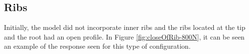   \subsection{Ribs} \label{subsec:ribs_results_model}

    Initially, the model did not incorporate inner ribs and the ribs located at the tip and the root had an open profile. In Figure \ref{fig:closeOfRib-800N}, it can be seen an example of the response seen for this type of configuration.

